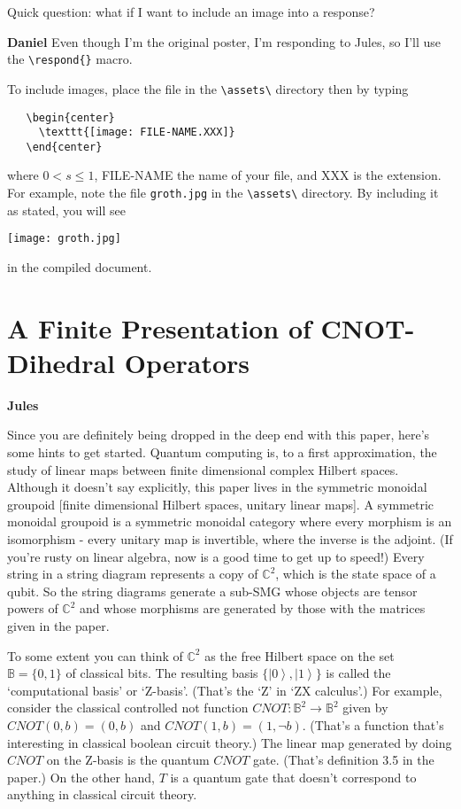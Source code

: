 \documentclass{amsart}
\newcommand{\respond}[1]{
  \vspace{1em} \textbf{#1}
}
\begin{document}
Quick question: what if I want to include an image into a
response?

\respond{Daniel} Even though I'm the original poster, I'm
responding to Jules, so I'll use the \verb|\respond{}|
macro.

To include images, place the file in the \verb|\assets\|
directory then by typing
\begin{verbatim}
   \begin{center}
     \texttt{[image: FILE-NAME.XXX]}
   \end{center}
\end{verbatim}
where $ 0< s \leq 1 $, FILE-NAME the name of your file, and XXX is the
extension. For example, note the file \verb|groth.jpg| in
the \verb|\assets\| directory. By including it as stated, you will see
\begin{center}
  \texttt{[image: groth.jpg]}
\end{center}
in the compiled document.


\section{A Finite Presentation of CNOT-Dihedral Operators}
\label{sec:finite-pres}


\respond{Jules}

Since you are definitely being dropped in the deep end with this paper, here's some hints to get started. Quantum computing is, to a first approximation, the study of linear maps between finite dimensional complex Hilbert spaces. Although it doesn't say explicitly, this paper lives in the symmetric monoidal groupoid [finite dimensional Hilbert spaces, unitary linear maps]. A symmetric monoidal groupoid is a symmetric monoidal category where every morphism is an isomorphism - every unitary map is invertible, where the inverse is the adjoint. (If you're rusty on linear algebra, now is a good time to get up to speed!) Every string in a string diagram represents a copy of $\mathbb C^2$, which is the state space of a qubit. So the string diagrams generate a sub-SMG whose objects are tensor powers of $\mathbb C^2$ and whose morphisms are generated by those with the matrices given in the paper.

To some extent you can think of $\mathbb C^2$ as the free Hilbert space on the set $\mathbb B = \{ 0, 1 \}$ of classical bits. The resulting basis $\{ \left| 0 \right>, \left| 1 \right> \}$ is called the `computational basis' or `Z-basis'. (That's the `Z' in `ZX calculus'.) For example, consider the classical controlled not function $CNOT : \mathbb B^2 \to \mathbb B^2$ given by $CNOT (0, b) = (0, b)$ and $CNOT (1, b) = (1, \neg b)$. (That's a function that's interesting in classical boolean circuit theory.) The linear map generated by doing $CNOT$ on the Z-basis is the quantum $CNOT$ gate. (That's definition 3.5 in the paper.) On the other hand, $T$ is a quantum gate that doesn't correspond to anything in classical circuit theory.
\end{document}
